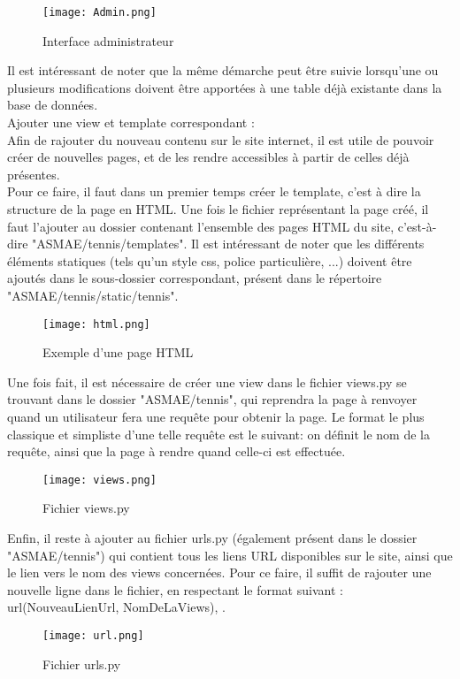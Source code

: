 \begin{figure}[H]
\centering
\texttt{[image: Admin.png]}
\caption{Interface administrateur}
\end{figure}

Il est intéressant de noter que la même démarche peut être suivie lorsqu'une ou plusieurs modifications doivent être apportées à une table déjà existante dans la base de données.\\

Ajouter une view et template correspondant :\\

Afin de rajouter du nouveau contenu sur le site internet, il est utile de pouvoir créer de nouvelles pages, et de les rendre accessibles à partir de celles déjà présentes.\\

Pour ce faire, il faut dans un premier temps créer le template, c'est à dire la structure de la page en HTML. Une fois le fichier représentant la page créé, il faut l'ajouter au dossier contenant l'ensemble des pages HTML du site, c'est-à-dire "ASMAE/tennis/templates". Il est intéressant de noter que les différents éléments statiques (tels qu'un style css, police particulière, ...) doivent être ajoutés dans le sous-dossier correspondant, présent dans le répertoire "ASMAE/tennis/static/tennis".\\

\begin{figure}[H]
\centering
\texttt{[image: html.png]}
\caption{Exemple d'une page HTML}
\end{figure}

Une fois fait, il est nécessaire de créer une view dans le fichier views.py se trouvant dans le dossier "ASMAE/tennis", qui reprendra la page à renvoyer quand un utilisateur fera une requête pour obtenir la page. Le format le plus classique et simpliste d'une telle requête est le suivant: on définit le nom de la requête, ainsi que la page à rendre quand celle-ci est effectuée.\\

\begin{figure}[H]
\centering
\texttt{[image: views.png]}
\caption{Fichier views.py}
\end{figure}

Enfin, il reste à ajouter au fichier urls.py (également présent dans le dossier "ASMAE/tennis") qui contient tous les liens URL disponibles sur le site, ainsi que le lien vers le nom des views concernées. Pour ce faire, il suffit de rajouter une nouvelle ligne dans le fichier, en respectant le format suivant : url(NouveauLienUrl, NomDeLaViews), .

\begin{figure}[H]
\centering
\texttt{[image: url.png]}
\caption{Fichier urls.py}
\end{figure}
